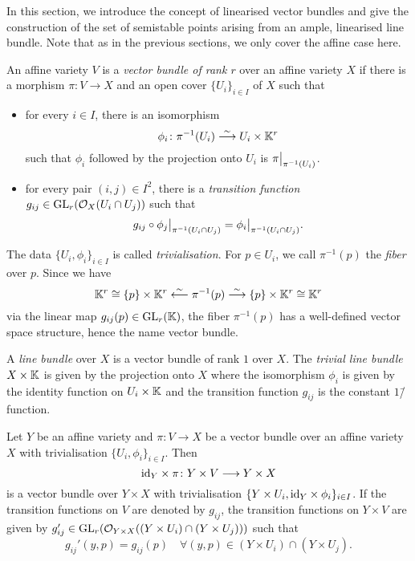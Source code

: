 In this section, we introduce the concept of linearised vector bundles and give the construction of the set of semistable points arising from an ample, linearised line bundle. Note that as in the previous sections, we only cover the affine case here.

\begin{defi}
	An affine variety $V$ is a \emph{vector bundle of rank $r$} over an affine variety $X$ if there is a morphism $\pi\colon V \rightarrow X$ and an open cover $\{U_i\}_{i\in I}$ of $X$ such that
	\begin{itemize}
		\item for every $i\in I$, there is an isomorphism
			$$\phi_i\colon \pi^{-1}(U_i) \overset{\sim}{\longrightarrow} U_i \times \mathbb{K}^r$$
			such that $\phi_i$ followed by the projection onto $U_i$ is $\pi{\big |_{\pi^{-1}(U_i)}}$.
		\item for every pair $(i,j)\in I^2$, there is a \emph{transition function} $g_{ij}\in \text{GL}_r(\mathcal{O}_X(U_i\cap U_j))$ such that
		$$g_{ij} \circ \phi_j{\big |_{\pi^{-1}(U_i\cap U_j)}} =  \phi_i{\big |_{\pi^{-1}(U_i\cap U_j)}}.$$
	\end{itemize}
	The data $\{U_i,\phi_i\}_{i\in I}$ is called \emph{trivialisation}. For $p\in U_i$, we call $\pi^{-1}(p)$ the \emph{fiber} over $p$. Since we have 
	$$\mathbb{K}^r \cong \{p\}\times \mathbb{K}^r \overset{\sim}{\longleftarrow} \pi^{-1}(p) \overset{\sim}{\longrightarrow} \{p\}\times \mathbb{K}^r \cong \mathbb{K}^r$$
	via the linear map $g_{ij}(p)\in\text{GL}_r(\mathbb{K})$, the fiber $\pi^{-1}(p)$ has a well-defined vector space structure, hence the name vector bundle.
	
	A \emph{line bundle} over $X$ is a vector bundle of rank $1$ over $X$. The \emph{trivial line bundle} $X\times\mathbb{K}$ is given by the projection onto $X$ where the isomorphism $\phi_i$ is given by the identity function on $U_i\times\mathbb{K}$ and the transition function $g_{ij}$ is the constant $1$\=/function.
\end{defi}

\begin{remark}
	Let $Y$ be an affine variety and $\pi\colon V \rightarrow X$ be a vector bundle over an affine variety $X$ with trivialisation $\{U_i,\phi_i\}_{i\in I}$. Then 
	$$\text{id}_Y \times \pi\colon Y\times V \longrightarrow Y\times X$$
	is a vector bundle over $Y\times X$ with trivialisation $\{Y\times U_i,\text{id}_Y \times \phi_i\}_{i\in I}$. If the transition functions on $V$ are denoted by $g_{ij}$, the transition functions on $Y\times V$ are given by
	$g_{ij}'\in \text{GL}_r(\mathcal{O}_{Y\times X}((Y\times U_i) \cap (Y \times U_j)))$ such that
	$$g_{ij}'(y,p) = g_{ij}(p)\quad \forall (y,p)\in(Y\times U_i) \cap (Y \times U_j).$$
\end{remark}

